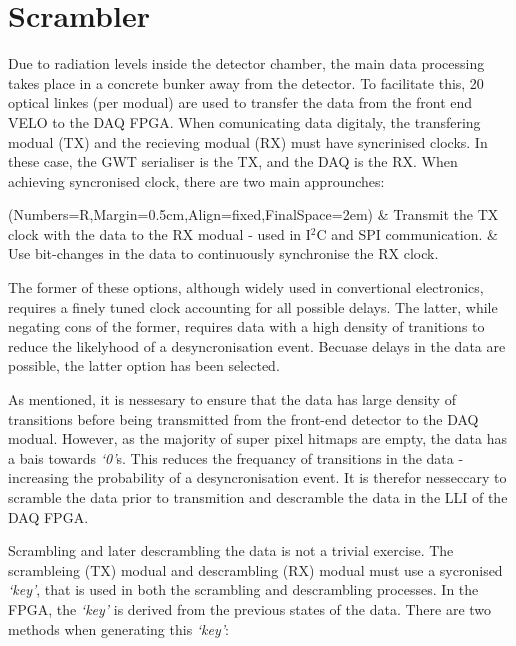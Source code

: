 \section{Scrambler}
\label{sec:scrambling_algorithms}

	Due to radiation levels inside the detector chamber, the main data processing takes place in a concrete bunker away from the detector.
	To facilitate this, 20 optical linkes (per modual) are used to transfer the data from the front end VELO to the DAQ FPGA.
	When comunicating data digitaly, the transfering modual (TX) and the recieving modual (RX) must have syncrinised clocks.
	In these case, the GWT serialiser is the TX, and the DAQ is the RX.
	When achieving syncronised clock, there are two main approunches:

	\begin{easylist}
		\ListProperties(Numbers=R,Margin=0.5cm,Align=fixed,FinalSpace=2em)
		& Transmit the TX clock with the data to the RX modual - used in I$^2$C and SPI communication.
		& Use bit-changes in the data to continuously synchronise the RX clock.
	\end{easylist}

	The former of these options, although widely used in convertional electronics, requires a finely tuned clock accounting for all possible delays.
	The latter, while negating cons of the former, requires data with a high density of tranitions to reduce the likelyhood of a desyncronisation event.
	Becuase delays in the data are possible, the latter option has been selected.

	As mentioned, it is nessesary to ensure that the data has large density of transitions before being transmitted from the front-end detector to the DAQ modual.
	However, as the majority of super pixel hitmaps are empty, the data has a bais towards \textit{`0'}s.
	This reduces the frequancy of transitions in the data - increasing the probability of a desyncronisation event.
	It is therefor nesseccary to scramble the data prior to transmition and descramble the data in the LLI of the DAQ FPGA.
	\par
	Scrambling and later descrambling the data is not a trivial exercise.
	The scrambleing (TX) modual and descrambling (RX) modual must use a sycronised \textit{`key'}, that is used in both the scrambling and descrambling processes.
	In the FPGA, the \textit{`key'} is derived from the previous states of the data.
	There are two methods when generating this \textit{`key'}:

